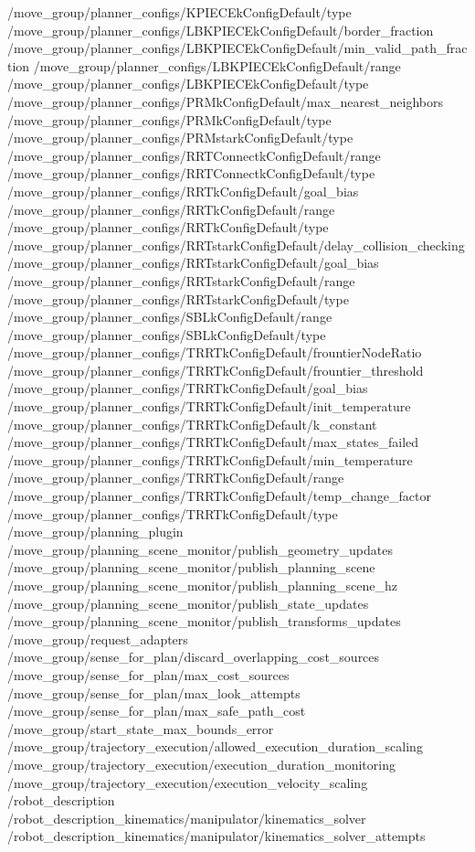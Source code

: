 \begin{DoxyVerb}
/move_group/planner_configs/KPIECEkConfigDefault/type
/move_group/planner_configs/LBKPIECEkConfigDefault/border_fraction
/move_group/planner_configs/LBKPIECEkConfigDefault/min_valid_path_fraction
/move_group/planner_configs/LBKPIECEkConfigDefault/range
/move_group/planner_configs/LBKPIECEkConfigDefault/type
/move_group/planner_configs/PRMkConfigDefault/max_nearest_neighbors
/move_group/planner_configs/PRMkConfigDefault/type
/move_group/planner_configs/PRMstarkConfigDefault/type
/move_group/planner_configs/RRTConnectkConfigDefault/range
/move_group/planner_configs/RRTConnectkConfigDefault/type
/move_group/planner_configs/RRTkConfigDefault/goal_bias
/move_group/planner_configs/RRTkConfigDefault/range
/move_group/planner_configs/RRTkConfigDefault/type
/move_group/planner_configs/RRTstarkConfigDefault/delay_collision_checking
/move_group/planner_configs/RRTstarkConfigDefault/goal_bias
/move_group/planner_configs/RRTstarkConfigDefault/range
/move_group/planner_configs/RRTstarkConfigDefault/type
/move_group/planner_configs/SBLkConfigDefault/range
/move_group/planner_configs/SBLkConfigDefault/type
/move_group/planner_configs/TRRTkConfigDefault/frountierNodeRatio
/move_group/planner_configs/TRRTkConfigDefault/frountier_threshold
/move_group/planner_configs/TRRTkConfigDefault/goal_bias
/move_group/planner_configs/TRRTkConfigDefault/init_temperature
/move_group/planner_configs/TRRTkConfigDefault/k_constant
/move_group/planner_configs/TRRTkConfigDefault/max_states_failed
/move_group/planner_configs/TRRTkConfigDefault/min_temperature
/move_group/planner_configs/TRRTkConfigDefault/range
/move_group/planner_configs/TRRTkConfigDefault/temp_change_factor
/move_group/planner_configs/TRRTkConfigDefault/type
/move_group/planning_plugin
/move_group/planning_scene_monitor/publish_geometry_updates
/move_group/planning_scene_monitor/publish_planning_scene
/move_group/planning_scene_monitor/publish_planning_scene_hz
/move_group/planning_scene_monitor/publish_state_updates
/move_group/planning_scene_monitor/publish_transforms_updates
/move_group/request_adapters
/move_group/sense_for_plan/discard_overlapping_cost_sources
/move_group/sense_for_plan/max_cost_sources
/move_group/sense_for_plan/max_look_attempts
/move_group/sense_for_plan/max_safe_path_cost
/move_group/start_state_max_bounds_error
/move_group/trajectory_execution/allowed_execution_duration_scaling
/move_group/trajectory_execution/execution_duration_monitoring
/move_group/trajectory_execution/execution_velocity_scaling
/robot_description
/robot_description_kinematics/manipulator/kinematics_solver
/robot_description_kinematics/manipulator/kinematics_solver_attempts

\end{DoxyVerb}
